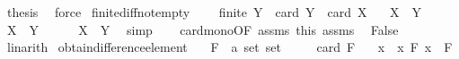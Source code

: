 \begin{isabellebody}
\ {\isacharquery}{\kern0pt}thesis\ \isamarkupfalse%
\ force\isanewline
{}\isamarkupfalse%
%
\endisatagproof
{\isafoldproof}%
%
\isadelimproof
\isanewline
%
\endisadelimproof
\isanewline
{}\isamarkupfalse%
\ finite{\isacharunderscore}{\kern0pt}diff{\isacharunderscore}{\kern0pt}not{\isacharunderscore}{\kern0pt}empty{\isacharcolon}{\kern0pt}\ \isanewline
\ \ \ {\isachardoublequoteopen}finite\ Y{\isachardoublequoteclose}\ \ {\isachardoublequoteopen}card\ Y\ {\isacharless}{\kern0pt}\ card\ X{\isachardoublequoteclose}\isanewline
\ \ \ {\isachardoublequoteopen}X\ {\isacharminus}{\kern0pt}\ Y\ {\isasymnoteq}\ {\isacharbraceleft}{\kern0pt}{\isacharbraceright}{\kern0pt}{\isachardoublequoteclose}\isanewline
%
\isadelimproof
%
\endisadelimproof
%
\isatagproof
{}\isamarkupfalse%
\isanewline
\ \ \isamarkupfalse%
\ {\isachardoublequoteopen}X\ {\isacharminus}{\kern0pt}\ Y\ {\isacharequal}{\kern0pt}\ {\isacharbraceleft}{\kern0pt}{\isacharbraceright}{\kern0pt}{\isachardoublequoteclose}\isanewline
\ \ \isamarkupfalse%
\ {\isachardoublequoteopen}X\ {\isasymsubseteq}\ Y{\isachardoublequoteclose}\ \isamarkupfalse%
\ simp\isanewline
\ \ \isamarkupfalse%
\ card{\isacharunderscore}{\kern0pt}mono{\isacharbrackleft}{\kern0pt}OF\ assms{\isacharparenleft}{\kern0pt}{}{\isacharparenright}{\kern0pt}\ this{\isacharbrackright}{\kern0pt}\ assms{\isacharparenleft}{\kern0pt}{}{\isacharparenright}{\kern0pt}\ \isamarkupfalse%
\ False\ \isamarkupfalse%
\ linarith\isanewline
{}\isamarkupfalse%
%
\endisatagproof
{\isafoldproof}%
%
\isadelimproof
\isanewline
%
\endisadelimproof
\isanewline
{}\isamarkupfalse%
\ obtain{\isacharunderscore}{\kern0pt}difference{\isacharunderscore}{\kern0pt}element{\isacharcolon}{\kern0pt}\isanewline
\ \ \ F\ {\isacharcolon}{\kern0pt}{\isacharcolon}{\kern0pt}\ {\isachardoublequoteopen}{\isacharprime}{\kern0pt}a\ set\ set{\isachardoublequoteclose}\isanewline
\ \ \ {\isachardoublequoteopen}{}\ {\isasymle}\ card\ F{\isachardoublequoteclose}\isanewline
\ \ \ {\isachardoublequoteopen}x{\isachardoublequoteclose}\ \ {\isachardoublequoteopen}x{\isasymin}\ {\isasymUnion}F{\isachardoublequoteclose}\ {\isachardoublequoteopen}x\ {\isasymnotin}\ {\isasymInter}F{\isachardoublequoteclose}\isanewline
%
\isadelimproof
%
\endisadelimproof

\end{isabellebody}
